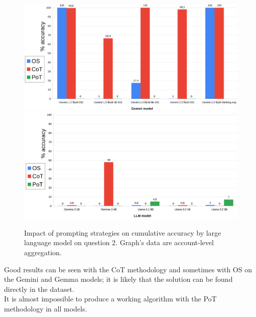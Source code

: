 \documentclass[12pt]{article}
\begin{document}
\vspace{2cm}


\begin{figure}[H]
    \centering
            \includegraphics[width=1\textwidth]{q104Gemini.png}
            \includegraphics[width=1\textwidth]{q104Other.png}
    \caption[Accuracy on Question 2 by LLM]{Impact of prompting strategies on cumulative accuracy by large language model on question 2. Graph's data are account-level aggregation.}
    \label{fig:27}
    \end{figure} 
Good results can be seen with the CoT methodology and sometimes with OS on the Gemini and Gemma models; it is likely that the solution can be found directly in the dataset.\\
It is almost impossible to produce a working algorithm with the PoT methodology in all models.\\

\vspace{2cm}

\end{document}
